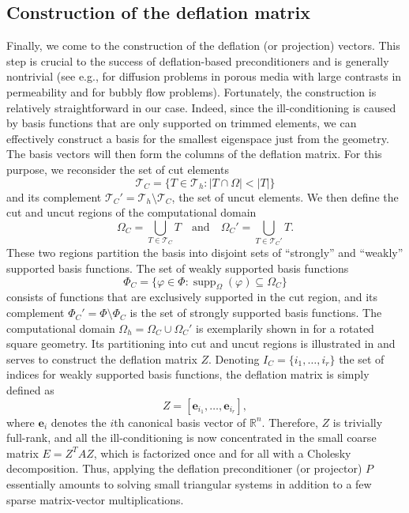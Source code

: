 \documentclass{article}
\numberwithin{equation}{section}
\DeclareMathOperator{\supp}{\operatorname{supp}}
\theoremstyle{definition}
\begin{document}
\subsection{Construction of the deflation matrix}
\label{se: Z_matrix_construction}
Finally, we come to the construction of the deflation (or projection) vectors. This step is crucial to the success of deflation-based preconditioners and is generally nontrivial (see e.g., \cite{vuik1999efficient,vermolen2004deflation} for diffusion problems in porous media with large contrasts in permeability and \cite{tang2008two} for bubbly flow problems). Fortunately, the construction is relatively straightforward in our case. Indeed, since the ill-conditioning is caused by basis functions that are only supported on trimmed elements, we can effectively construct a basis for the smallest eigenspace just from the geometry. The basis vectors will then form the columns of the deflation matrix. For this purpose, we reconsider the set of cut elements
\begin{equation*}
    \mathcal{T}_C = \{T \in \mathcal{T}_h \colon |T \cap \Omega | <  |T| \}
\end{equation*}
and its complement $\mathcal{T}_C' = \mathcal{T}_h \setminus \mathcal{T}_C$, the set of uncut elements. We then define the cut and uncut regions of the computational domain
\begin{equation*}
    \Omega_C = \bigcup_{T \in \mathcal{T}_C} T \quad \text{and} \quad \Omega_C' = \bigcup_{T \in \mathcal{T}_C'} T.
\end{equation*}
These two regions partition the basis into disjoint sets of ``strongly'' and ``weakly'' supported basis functions. The set of weakly supported basis functions
\begin{equation*}
    \Phi_C = \{\varphi \in \Phi \colon \supp_{\Omega}(\varphi) \subseteq \Omega_C\}
\end{equation*}
consists of functions that are exclusively supported in the cut region, and its complement $\Phi_C' = \Phi \setminus \Phi_C$ is the set of strongly supported basis functions. The computational domain $\Omega_h = \Omega_C \cup \Omega_C'$ is exemplarily shown in  for a rotated square geometry. Its partitioning into cut and uncut regions is illustrated in  and serves to construct the deflation matrix $Z$. Denoting $I_C=\{i_1,\dots,i_r\}$ the set of indices for weakly supported basis functions, the deflation matrix is simply defined as
\begin{equation*}
    Z = [\bm{e}_{i_1},\dots,\bm{e}_{i_r}],
\end{equation*}
where $\bm{e}_i$ denotes the $i$th canonical basis vector of $\mathbb{R}^n$. Therefore, $Z$ is trivially full-rank, and all the ill-conditioning is now concentrated in the small coarse matrix $E=Z^TAZ$, which is factorized once and for all with a Cholesky decomposition. Thus, applying the deflation preconditioner (or projector) $P$ essentially amounts to solving small triangular systems in addition to a few sparse matrix-vector multiplications. 
\end{document}
